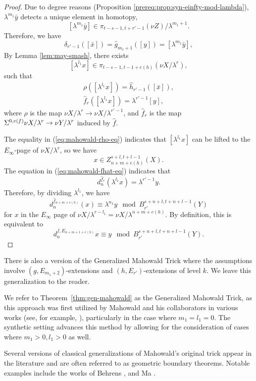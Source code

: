 \begin{proof}
    Due to degree reasons (Proposition \ref{prereq:prop:syn-einfty-mod-lambda}), $\lambda^{m_1}\bar y$ detects a unique element in homotopy,
    $$[\lambda^{m_1}\bar y]\in \pi_{t-s-1, t+r'-1}(\nu Z)/\lambda^{m_1+1}.$$
    Therefore, we have
    $$\delta_{r'-1}([\bar x])=\hat g_{m_1+1}([y])=[\lambda^{m_1}\bar y],$$
    By Lemma \ref{lem:may-smash}, there exists
    $$[\lambda^{l_1}x]\in \pi_{t-s-1,t-1+e(h)}(\nu X/\lambda^r),$$
    such that
    \begin{gather}
        \rho ([\lambda^{l_1}x])=\hat h_{r'-1}([\bar x]),\label{eq:mahowald-rho-eq}\\
        \hat f_r([\lambda^{l_1}x])=\lambda^{r'-1}[y],\label{eq:mahowald-fhat-eq}
    \end{gather}
    where $\rho$ is the map $\nu X/\lambda^r\to \nu X/\lambda^{r'-1}$, and $\hat f_r$ is the map $\Sigma^{0,e(f)}\nu X/\lambda^r\to \nu Y/\lambda^r$ induced by $\hat f$.
    
    The equality in (\ref{eq:mahowald-rho-eq}) indicates that $[\lambda^{l_1}x]$ can be lifted to the $E_\infty$-page of $\nu X/\lambda^r$, so we have
    $$x\in Z_{n+m+e(h)}^{s+l,t+l-1}(X).$$
    The equation in (\ref{eq:mahowald-fhat-eq}) indicates that
    $$d^{\hat f_r}_n(\lambda^{l_1}x)=\lambda^{r'-1}y.$$
    Therefore, by dividing $\lambda^{l_1}$, we have
    $$d^{\hat f_{n+m+e(h)}}_n(x)\equiv \lambda^{n_1}y \mod B_{r'}^{s+n+l,t+n+l-1}(Y)$$
    for $x$ in the $E_\infty$ page of $\nu X/\lambda^{r-l_1}=\nu X/\lambda^{n+m+e(h)}$. By definition, this is equivalent to
    $$d^{f, E_{n+m+1+e(h)}}_nx\equiv y \mod B_{r'}^{s+n+l,t+n+l-1}(Y).$$
\end{proof}

\begin{remark}
    There is also a version of the Generalized Mahowald Trick where the assumptions involve $(g, E_{m_1+2})$-extensions and $(h, E_{r'})$-extensions of level $k$. We leave this generalization to the reader.
\end{remark}

    We refer to Theorem~\ref{thm:gen-mahowald} as the Generalized Mahowald Trick, as this approach was first utilized by Mahowald and his collaborators in various works (see, for example, \cite{MahowaldTangora}), particularly in the case where $m_1 = l_1 = 0$. The synthetic setting advances this method by allowing for the consideration of cases where $m_1>0, l_1>0$ as well. 
    
\begin{remark}
    Several versions of classical generalizations of Mahowald's original trick appear in the literature and are often referred to as geometric boundary theorems. Notable examples include the works of Behrens \cite{Behrens}, and Ma \cite{Ma}.
\end{remark}

